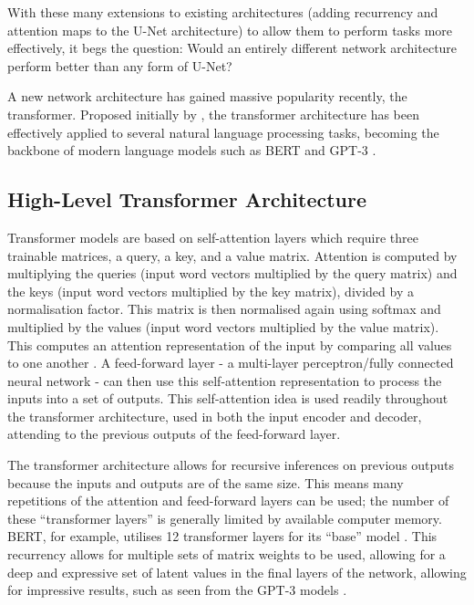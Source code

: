 \documentclass{l4proj}
\begin{document}
With these many extensions to existing architectures (adding recurrency and attention maps to the U-Net architecture) to allow them to perform tasks more effectively, it begs the question: Would an entirely different network architecture perform better than any form of U-Net?

A new network architecture has gained massive popularity recently, the transformer. Proposed initially by \cite{vaswani2017attention}, the transformer architecture has been effectively applied to several natural language processing tasks, becoming the backbone of modern language models such as BERT and GPT-3 \citep{devlin2018bert, brown2020language}.

	\subsection{High-Level Transformer Architecture}

Transformer models are based on self-attention layers which require three trainable matrices, a query, a key, and a value matrix. Attention is computed by multiplying the queries (input word vectors multiplied by the query matrix) and the keys (input word vectors multiplied by the key matrix), divided by a normalisation factor. This matrix is then normalised again using softmax and multiplied by the values (input word vectors multiplied by the value matrix). This computes an attention representation of the input by comparing all values to one another \citep{vaswani2017attention}. A feed-forward layer - a multi-layer perceptron/fully connected neural network - can then use this self-attention representation to process the inputs into a set of outputs. This self-attention idea is used readily throughout the transformer architecture, used in both the input encoder and decoder, attending to the previous outputs of the feed-forward layer.

The transformer architecture allows for recursive inferences on previous outputs because the inputs and outputs are of the same size. This means many repetitions of the attention and feed-forward layers can be used; the number of these “transformer layers” is generally limited by available computer memory. BERT, for example, utilises 12 transformer layers for its “base” model \citep{devlin2018bert}. This recurrency allows for multiple sets of matrix weights to be used, allowing for a deep and expressive set of latent values in the final layers of the network, allowing for impressive results, such as seen from the GPT-3 models \citep{brown2020language}.
\end{document}
